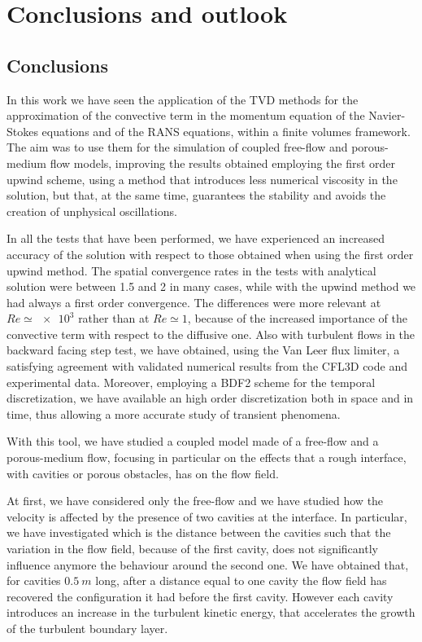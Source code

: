\chapter{Conclusions and outlook}
\section{Conclusions}
In this work we have seen the application of the TVD methods for the 
approximation of the convective term in the momentum equation of the 
Navier-Stokes equations and of the RANS equations, within a finite volumes 
framework. The aim was to use them for the simulation of coupled free-flow and 
porous-medium flow models, improving the results obtained employing the 
first order upwind scheme, using a method that introduces less numerical 
viscosity in the solution, but that, at the same time, guarantees the stability 
and avoids the creation of unphysical oscillations.

In all the tests that have been performed, we have experienced an increased 
accuracy of the solution with respect to those obtained when using the first order 
upwind method. The spatial convergence rates in the tests with analytical 
solution were between 1.5 and 2 in many cases, while with the upwind method we had always a first order convergence. 
The differences were more relevant at $Re\simeq\num{e3}$ rather than at 
$Re\simeq1$, because of the increased importance of the convective term with 
respect to the diffusive one. Also with turbulent flows in the backward facing 
step test, we have 
obtained, using the Van Leer flux limiter, a satisfying agreement with 
validated numerical results from the CFL3D code and experimental data.
Moreover, employing a BDF2 scheme for the 
temporal discretization, we have available an high order discretization both 
in space and in time, thus allowing a more accurate study of transient 
phenomena.

With this tool, we have studied a coupled model made of a free-flow and a 
porous-medium flow, focusing in particular on the effects that a rough
interface, with cavities or porous obstacles, has on the flow field.

At first, we have considered only the free-flow and we have studied how the 
velocity is affected by the presence of two cavities at the interface.
In particular, we have investigated which is the distance between the cavities such that the variation in the flow field, 
because of the first cavity, does not significantly influence anymore the 
behaviour around the 
second one. We have obtained that, for cavities $\SI{0.5}{m}$ long, after a 
distance equal to one cavity the flow field has recovered the configuration it 
had before the first cavity. However each cavity introduces an increase in the 
turbulent kinetic energy, that accelerates the growth of the turbulent 
boundary layer.

